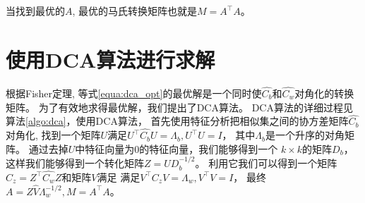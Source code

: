 当找到最优的$A$, 最优的马氏转换矩阵也就是$M = A^\top A$。

\section{使用DCA算法进行求解}
\label{sec:algorithm_dca}

根据Fisher定理,
等式\ref{equa:dca_opt}的最优解是一个同时使$\hat{C_b}$和$\hat{C_w}$对角化的转换矩阵。
为了有效地求得最优解，我们提出了DCA算法。
DCA算法的详细过程见算法\ref{algo:dca}，使用DCA算法，
首先使用特征分析把相似集之间的协方差矩阵$\hat{C_b}$对角化,
找到一个矩阵$U$满足$U^\top \hat{C_b} U = \Lambda_b, U^\top U = I$，
其中$\Lambda_b$是一个升序的对角矩阵。
通过去掉$U$中特征向量为0的特征向量，我们能够得到一个
$k \times k$的矩阵$D_b$，这样我们能够得到一个转化矩阵$Z = \hat{U}D_b^{-1/2}$。
利用它我们可以得到一个矩阵$C_z = Z^\top\hat{C_w}Z$和矩阵$V$满足
满足$V^\top C_z V = \Lambda_w, V^\top V = I$，
最终$A = Z\hat{V}\Lambda_w^{-1/2}, M = A^\top A$。 
 



        

